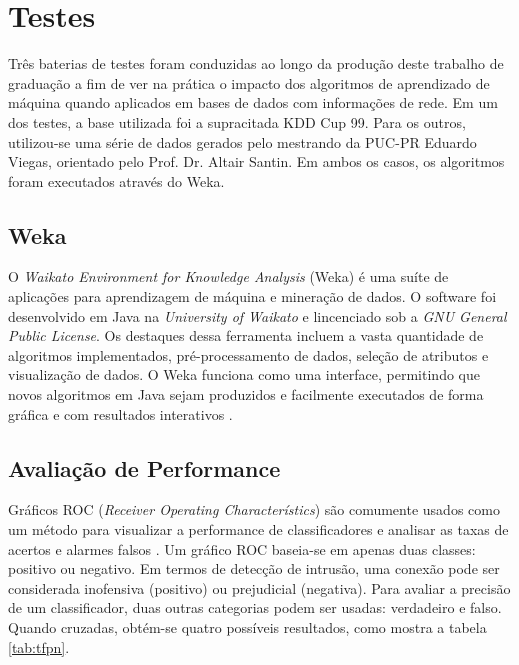 \chapter{Testes}
Três baterias de testes foram conduzidas ao longo da produção deste trabalho de graduação a fim de ver na prática o
impacto dos algoritmos de aprendizado de máquina quando aplicados em bases de dados com informações de rede.
Em um dos testes, a base utilizada foi a supracitada KDD Cup 99. Para os outros, utilizou-se uma série de dados
 gerados pelo mestrando da PUC-PR Eduardo Viegas, orientado pelo Prof. Dr. Altair Santin. Em ambos os casos, os algoritmos foram
 executados através do Weka.

\section{Weka}
O \textit{Waikato Environment for Knowledge Analysis} (Weka) é uma suíte de aplicações para aprendizagem de máquina e
mineração de dados. O software foi desenvolvido em Java na \textit{University of Waikato} e lincenciado sob a
\textit{GNU General Public License}. Os destaques dessa ferramenta incluem a vasta quantidade de algoritmos
implementados, pré-processamento de dados, seleção de atributos e visualização de dados. O Weka funciona como uma
interface, permitindo que novos algoritmos em Java sejam produzidos e facilmente executados de forma gráfica e com
resultados interativos \cite{bouckaert10}.

\section{Avaliação de Performance}
Gráficos ROC (\textit{Receiver Operating Characterístics}) são comumente usados como um método  para visualizar
a performance de classificadores e analisar as taxas de acertos e alarmes falsos \cite{fawcett04}. Um gráfico ROC
baseia-se em apenas duas classes: positivo ou negativo. Em termos de detecção de intrusão, uma conexão pode ser
considerada inofensiva (positivo) ou prejudicial (negativa). Para avaliar a precisão de um classificador,
duas outras categorias podem ser usadas: verdadeiro e falso. Quando cruzadas, obtém-se quatro possíveis resultados,
como mostra a tabela \ref{tab:tfpn}.


